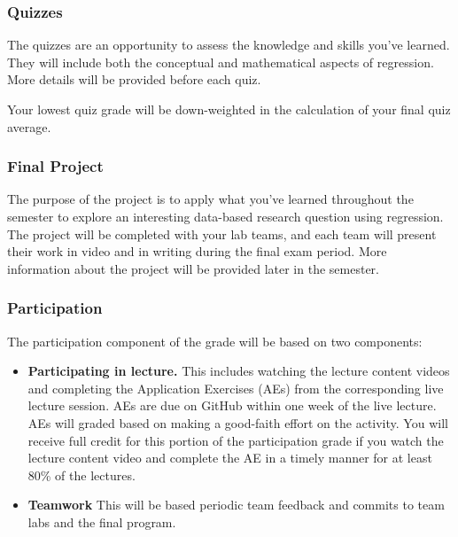 \documentclass[
]{article}
\begin{document}
\hypertarget{quizzes}{%
\subsubsection{Quizzes}\label{quizzes}}

The quizzes are an opportunity to assess the knowledge and skills you've
learned. They will include both the conceptual and mathematical aspects
of regression. More details will be provided before each quiz.

Your lowest quiz grade will be down-weighted in the calculation of your
final quiz average.

\hypertarget{final-project}{%
\subsubsection{Final Project}\label{final-project}}

The purpose of the project is to apply what you've learned throughout
the semester to explore an interesting data-based research question
using regression. The project will be completed with your lab teams, and
each team will present their work in video and in writing during the
final exam period. More information about the project will be provided
later in the semester.

\hypertarget{participation}{%
\subsubsection{Participation}\label{participation}}

The participation component of the grade will be based on two
components:

\begin{itemize}
\item
  \textbf{Participating in lecture.} This includes watching the lecture
  content videos and completing the Application Exercises (AEs) from the
  corresponding live lecture session. AEs are due on GitHub within one
  week of the live lecture. AEs will graded based on making a good-faith
  effort on the activity. You will receive full credit for this portion
  of the participation grade if you watch the lecture content video and
  complete the AE in a timely manner for at least 80\% of the lectures.
\item
  \textbf{Teamwork} This will be based periodic team feedback and
  commits to team labs and the final program.
\end{itemize}
\end{document}
